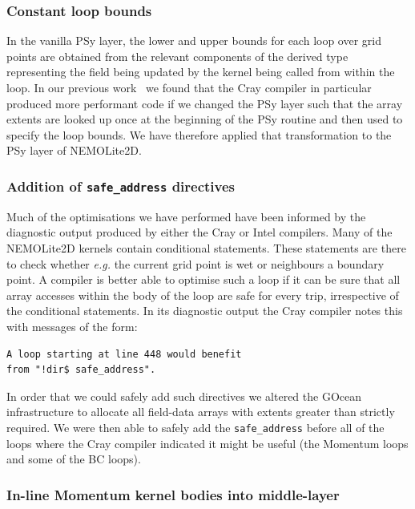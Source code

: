 \documentclass[gmdd, manuscript]{copernicus}
\begin{document}
\subsubsection{Constant loop bounds}

In the vanilla {PS}y layer, the lower and upper bounds for each loop
over grid points are obtained from the relevant components of the
derived type representing the field being updated by the kernel being
called from within the loop. In our previous
work~\citep{shallow_psykal} we found that the Cray compiler in
particular produced more performant code if we changed the PSy layer
such that the array extents are looked up once at the beginning of the
PSy routine and then used to specify the loop bounds. We have therefore
applied that transformation to the PSy layer of NEMOLite2D.

\subsubsection{Addition of \texttt{safe\_address} directives}
\label{sec_safe_address}

Much of the optimisations we have performed have been informed by the
diagnostic output produced by either the Cray or Intel compilers. Many
of the NEMOLite2D kernels contain conditional statements. These
statements are there to check whether \textit{e.g.} the current grid
point is wet or neighbours a boundary point. A compiler is better able
to optimise such a loop if it can be sure that all array accesses
within the body of the loop are safe for every trip, irrespective of
the conditional statements. In its diagnostic output the Cray compiler
notes this with messages of the form:
\begin{verbatim}
A loop starting at line 448 would benefit 
from "!dir$ safe_address".
\end{verbatim}
In order that we could safely add such directives we altered the
GOcean infrastructure to allocate all field-data arrays with extents
greater than strictly required.  We were then able to safely add the
\texttt{safe\_address} before all of the loops where the Cray compiler
indicated it might be useful (the Momentum loops and some of the BC
loops).

\subsubsection{In-line Momentum kernel bodies into middle-layer}
\label{sec_inline_mom}
\end{document}
